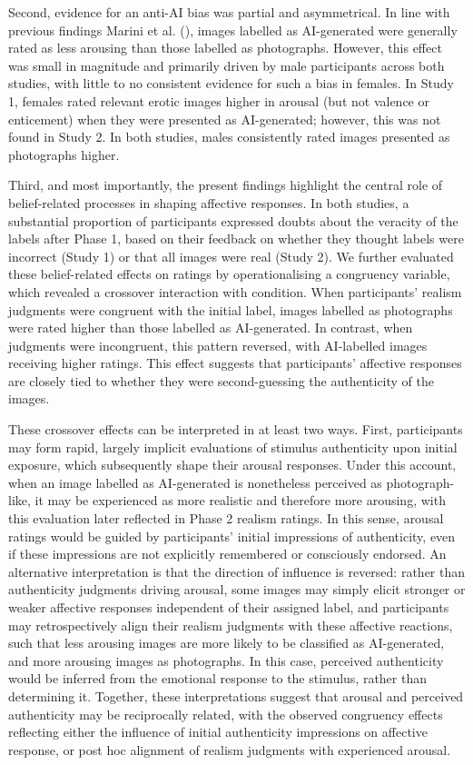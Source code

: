 \documentclass[
  jou,
  floatsintext,
  longtable,
  nolmodern,
  notxfonts,
  notimes,
  colorlinks=true,linkcolor=blue,citecolor=blue,urlcolor=blue]{apa7}
\begin{document}
Second, evidence for an anti-AI bias was partial and asymmetrical. In
line with previous findings Marini et al.
(), images labelled as AI-generated
were generally rated as less arousing than those labelled as
photographs. However, this effect was small in magnitude and primarily
driven by male participants across both studies, with little to no
consistent evidence for such a bias in females. In Study 1, females
rated relevant erotic images higher in arousal (but not valence or
enticement) when they were presented as AI-generated; however, this was
not found in Study 2. In both studies, males consistently rated images
presented as photographs higher.

Third, and most importantly, the present findings highlight the central
role of belief-related processes in shaping affective responses. In both
studies, a substantial proportion of participants expressed doubts about
the veracity of the labels after Phase 1, based on their feedback on
whether they thought labels were incorrect (Study 1) or that all images
were real (Study 2). We further evaluated these belief-related effects
on ratings by operationalising a congruency variable, which revealed a
crossover interaction with condition. When participants' realism
judgments were congruent with the initial label, images labelled as
photographs were rated higher than those labelled as AI-generated. In
contrast, when judgments were incongruent, this pattern reversed, with
AI-labelled images receiving higher ratings. This effect suggests that
participants' affective responses are closely tied to whether they were
second-guessing the authenticity of the images.

These crossover effects can be interpreted in at least two ways. First,
participants may form rapid, largely implicit evaluations of stimulus
authenticity upon initial exposure, which subsequently shape their
arousal responses. Under this account, when an image labelled as
AI-generated is nonetheless perceived as photograph-like, it may be
experienced as more realistic and therefore more arousing, with this
evaluation later reflected in Phase 2 realism ratings. In this sense,
arousal ratings would be guided by participants' initial impressions of
authenticity, even if these impressions are not explicitly remembered or
consciously endorsed. An alternative interpretation is that the
direction of influence is reversed: rather than authenticity judgments
driving arousal, some images may simply elicit stronger or weaker
affective responses independent of their assigned label, and
participants may retrospectively align their realism judgments with
these affective reactions, such that less arousing images are more
likely to be classified as AI-generated, and more arousing images as
photographs. In this case, perceived authenticity would be inferred from
the emotional response to the stimulus, rather than determining it.
Together, these interpretations suggest that arousal and perceived
authenticity may be reciprocally related, with the observed congruency
effects reflecting either the influence of initial authenticity
impressions on affective response, or post hoc alignment of realism
judgments with experienced arousal.
\end{document}
